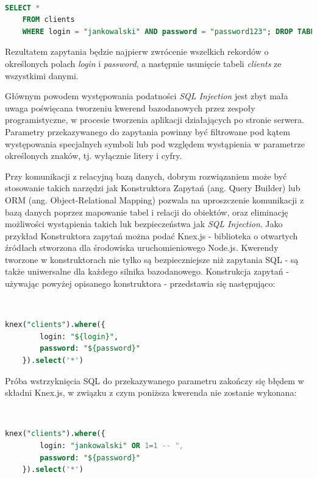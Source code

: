 \documentclass[12pt,twoside]{article}
\begin{document}
\

\begin{lstlisting}[language=SQL,caption=Zmodyfikowane zapytanie usuwające tabelę clients,label={KodSQL6}]
	SELECT * 
	FROM clients
	WHERE login = "jankowalski" AND password = "password123"; DROP TABLE clients;--"
\end{lstlisting}	

Rezultatem zapytania będzie najpierw zwrócenie wszelkich rekordów o określonych polach \emph{login} i \emph{password}, a następnie usunięcie tabeli \emph{clients} ze wszystkimi danymi.

Głównym powodem występowania podatności \emph{SQL Injection} jest zbyt mała uwaga poświęcana tworzeniu kwerend bazodanowych przez zespoły programistyczne, w procesie tworzenia aplikacji działających po stronie serwera. Parametry przekazywanego do zapytania powinny być filtrowane pod kątem występowania specjalnych symboli lub pod względem wystąpienia w parametrze określonych znaków, tj. wyłącznie litery i cyfry.

Przy komunikacji z relacyjną bazą danych, dobrym rozwiązaniem może być stosowanie takich narzędzi jak Konstruktora Zapytań (ang. Query Builder) lub ORM (ang. Object-Relational Mapping) pozwala na uproszczenie komunikacji z bazą danych poprzez mapowanie tabel i relacji do obiektów, oraz eliminację możliwości wystąpienia takich luk bezpieczeństwa jak \emph{SQL Injection}. Jako przykład Konstruktora zapytań można podać Knex.js - biblioteka o otwartych źródłach stworzona dla środowiska uruchomieniowego Node.js. Kwerendy tworzone w konstruktorach nie tylko są bezpieczniejsze niż zapytania SQL - są także uniwersalne dla każdego silnika bazodanowego. Konstrukcja zapytań - używając powyżej opisanego konstruktora - przedstawia się następująco:

\

\begin{lstlisting}[language=SQL,caption=Kwerenda bazodanowa stworzona przy użyciu konstruktora zapytań Knex.js,label={KodSQL7}]	
	knex("clients").where({
		login: "${login}",
		password: "${password}"
	}).select('*')
\end{lstlisting}	

Próba wstrzyknięcia SQL do przekazywanego parametru zakończy się błędem w składni Knex.js, w związku z czym poniższa kwerenda nie zostanie wykonana:

\

\begin{lstlisting}[language=SQL,caption=Próba wykonania wstrzyknięcia SQL na konstruktorze zapytań Knex.js ,label={KodSQL8}]	
	knex("clients").where({
		login: "jankowalski" OR 1=1 -- ",
		password: "${password}"
	}).select('*')
\end{lstlisting}	
\end{document}
